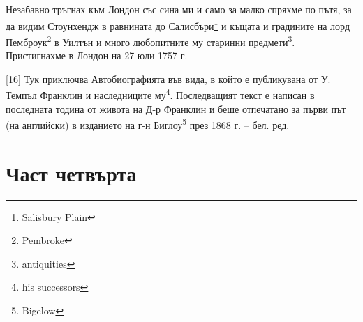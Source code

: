 \documentclass[12pt]{book}
\begin{document}
Незабавно тръгнах към Лондон със сина ми и само за малко спряхме по пътя, за да видим Стоунхендж в равнината до Салисбъри\footnote{Salisbury Plain} и къщата и градините на лорд Пемброук\footnote{Pembroke} в Уилтън и много любопитните му старинни предмети\footnote{antiquities}. Пристигнахме в Лондон на 27 юли 1757 г.

[16] Тук приключва Автобиографията във вида, в който е публикувана от У. Темпъл Франклин и наследниците му\footnote{his successors}. Последващият текст е написан в последната тодина от живота на Д-р Франклин и беше отпечатано за първи път (на английски) в изданието на г-н Биглоу\footnote{Bigelow} през 1868 г. – бел. ред.

\chapter{Част четвърта}
\end{document}
